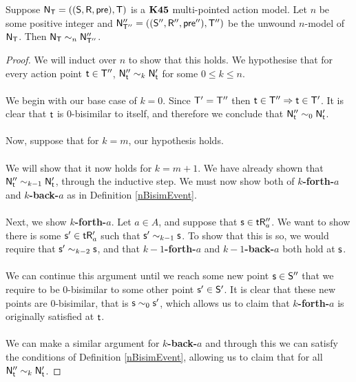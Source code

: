 \begin{lemma} \label{lemma:unwoundNModelNBisimilar}
  Suppose $\mathrm{\mathsf{N}}_\mathrm{\mathsf{T}} = ((\mathrm{\mathsf{S}},\mathrm{\mathsf{R}},\mathrm{\mathsf{pre}}),\mathrm{\mathsf{T}})$ is a $\bf K45$ multi-pointed
  action model.
  Let $n$ be some positive integer and $\mathrm{\mathsf{N}}''_{\mathrm{\mathsf{T}}''} = ((\mathrm{\mathsf{S}}'',\mathrm{\mathsf{R}}'',\mathrm{\mathsf{pre}}''),\mathrm{\mathsf{T}}'')$ be the
	unwound $n$-model of $\mathrm{\mathsf{N}}_\mathrm{\mathsf{T}}$.
  Then $\mathrm{\mathsf{N}}_\mathrm{\mathsf{T}} \sim_n \mathrm{\mathsf{N}}''_{\mathrm{\mathsf{T}}''}$.
\end{lemma}
\begin{proof}
	We will induct over $n$ to show that this holds.
	We hypothesise that for every action point $\mathrm{\mathsf{t}} \in \mathrm{\mathsf{T}}''$, $\mathrm{\mathsf{N}}''_\mathrm{\mathsf{t}} \sim_k \mathrm{\mathsf{N}}'_{\mathrm{\mathsf{t}}}$
	for some $0 \leq k \leq n$.\\
	\\
	We begin with our base case of $k = 0$.
	Since $\mathrm{\mathsf{T}}' = \mathrm{\mathsf{T}}''$ then $\mathrm{\mathsf{t}} \in \mathrm{\mathsf{T}}'' \Rightarrow \mathrm{\mathsf{t}} \in \mathrm{\mathsf{T}}'$.
	It is clear that $\mathrm{\mathsf{t}}$ is $0$-bisimilar to itself, and therefore we conclude that $\mathrm{\mathsf{N}}''_\mathrm{\mathsf{t}}
	\sim_0 \mathrm{\mathsf{N}}'_\mathrm{\mathsf{t}}$.\\
	\\
	Now, suppose that for $k = m$, our hypothesis holds.\\
	\\
	We will show that it now holds for $k = m+1$.
	We have already shown that $\mathrm{\mathsf{N}}''_\mathrm{\mathsf{t}} \sim_{k-1} \mathrm{\mathsf{N}}'_\mathrm{\mathsf{t}}$, through the inductive step.
	We must now show both of {\bf $k$-forth-$a$} and {\bf $k$-back-$a$} as in Definition
	\ref{nBisimEvent}.\\
	\\
	Next, we show {\bf $k$-forth-$a$}.
	Let $a \in A$, and suppose that $\mathrm{\mathsf{s}} \in \mathrm{\mathsf{t}} \mathrm{\mathsf{R}}''_a$.
	We want to show there is some $\mathrm{\mathsf{s}}' \in \mathrm{\mathsf{t}} \mathrm{\mathsf{R}}'_a$ such that $\mathrm{\mathsf{s}}' \sim_{k-1} \mathrm{\mathsf{s}}$.
	To show that this is so, we would require that $\mathrm{\mathsf{s}}' \sim_{k-2} \mathrm{\mathsf{s}}$, and that {\bf
	$k-1$-forth-$a$} and {\bf $k-1$-back-$a$} both hold at $\mathrm{\mathsf{s}}$.\\
	\\
	We can continue this argument until we reach some new point $\mathrm{\mathsf{s}} \in \mathrm{\mathsf{S}}''$ that we require to be
	$0$-bisimilar to some other point $\mathrm{\mathsf{s}}' \in \mathrm{\mathsf{S}}'$.
	It is clear that these new points are 0-bisimilar, that is $\mathrm{\mathsf{s}} \sim_0 \mathrm{\mathsf{s}}'$, which allows us to
	claim that {\bf $k$-forth-$a$} is originally satisfied at $\mathrm{\mathsf{t}}$.\\
	\\
	We can make a similar argument for {\bf $k$-back-$a$} and through this we can satisfy the
	conditions of Definition \ref{nBisimEvent}, allowing us to claim that for all $\mathrm{\mathsf{N}}''_\mathrm{\mathsf{t}} \sim_k
	\mathrm{\mathsf{N}}'_{\mathrm{\mathsf{t}}}$.
\end{proof}

